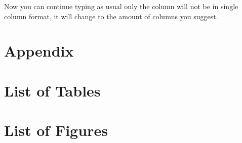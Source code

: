 \documentclass[12pt]{article}   %
\theoremstyle{plain}
\begin{document}
{\setlength{\columnseprule}{0pt}
\begin{multicols}{3}
\raggedright
Now you can continue typing as usual only the column will not be in single column format, it will change to the amount of columns you suggest.
\end{multicols}
}


\clearpage

\appendix
\section*{Appendix}

\section{List of Tables}\label{sec:tables}

\listoftables

\section{List of Figures}\label{sec:figures}

\listoffigures

\newpage
\nocite{weening}




\newpage
\printindex
\end{document}
